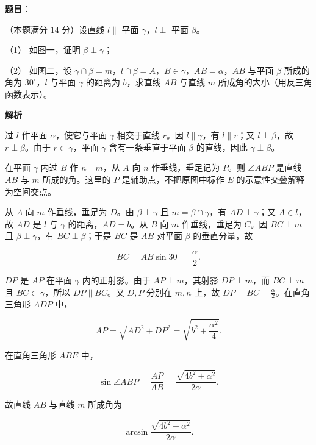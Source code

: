 \begin{answer}

\textbf{题目}：

（本题满分 14 分）设直线 $l\parallel$ 平面 $\gamma$，$l\perp$ 平面 $\beta$。

（1） 如图一，证明 $\beta\perp\gamma$；

（2） 如图二，设 $\gamma\cap\beta=m$，$l\cap\beta=A$，$B\in\gamma$，$AB=\alpha$，$AB$ 与平面 $\beta$ 所成的角为 $30^\circ$，$l$ 与平面 $\gamma$ 的距离为 $b$，求直线 $AB$ 与直线 $m$ 所成角的大小（用反三角函数表示）。
\nopagebreak[4]
\begin{center}\end{center}
\nopagebreak[4]
\Needspace{0.4\textheight}

\textbf{解析}


过 $l$ 作平面 $\alpha$，使它与平面 $\gamma$ 相交于直线 $r$。因 $l\parallel\gamma$，有 $l\parallel r$；又 $l\perp\beta$，故 $r\perp\beta$。由于 $r\subset\gamma$，平面 $\gamma$ 含有一条垂直于平面 $\beta$ 的直线，因此 $\gamma\perp\beta$。


在平面 $\gamma$ 内过 $B$ 作 $n\parallel m$，从 $A$ 向 $n$ 作垂线，垂足记为 $P$。则 $\angle ABP$ 是直线 $AB$ 与 $m$ 所成的角。这里的 $P$ 是辅助点，不把原图中标作 $E$ 的示意性交叠解释为空间交点。

从 $A$ 向 $m$ 作垂线，垂足为 $D$。由 $\beta\perp\gamma$ 且 $m=\beta\cap\gamma$，有 $AD\perp\gamma$；又 $A\in l$，故 $AD$ 是 $l$ 与 $\gamma$ 的距离，$AD=b$。从 $B$ 向 $m$ 作垂线，垂足为 $C$。因 $BC\perp m$ 且 $\beta\perp\gamma$，有 $BC\perp\beta$；于是 $BC$ 是 $AB$ 对平面 $\beta$ 的垂直分量，故

\nopagebreak[4]
\[
BC=AB\sin30^\circ=\frac{\alpha}{2}.
\]

$DP$ 是 $AP$ 在平面 $\gamma$ 内的正射影。由于 $AP\perp m$，其射影 $DP\perp m$，而 $BC\perp m$ 且 $BC\subset\gamma$，所以 $DP\parallel BC$。又 $D,P$ 分别在 $m,n$ 上，故 $DP=BC=\frac{\alpha}{2}$。在直角三角形 $ADP$ 中，

\nopagebreak[4]
\[
AP=\sqrt{AD^2+DP^2}=\sqrt{b^2+\frac{\alpha^2}{4}}.
\]

在直角三角形 $ABE$ 中，

\nopagebreak[4]
\[
\sin\angle ABP=\frac{AP}{AB}=\frac{\sqrt{4b^2+\alpha^2}}{2\alpha}.
\]

故直线 $AB$ 与直线 $m$ 所成角为

\nopagebreak[4]
\[
\arcsin\frac{\sqrt{4b^2+\alpha^2}}{2\alpha}.
\]



\end{answer}
